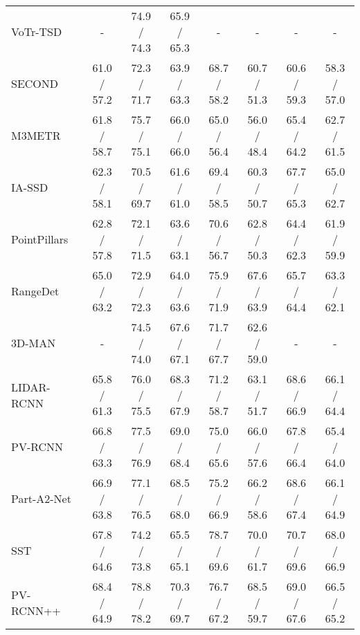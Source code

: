 \documentclass[10pt,twocolumn,letterpaper]{article}
\begin{document}
{\begin{table*}[t]
\begin{center}
{\begin{tabular}{|l|c|cc|cc|cc|}
VoTr-TSD~\cite{voxeltransformer}                                        &  -  & 74.9 / 74.3     & 65.9 / 65.3     & -  &  -       &  -      &  -     \\
SECOND~\cite{second}                                         & 61.0 / 57.2 & 72.3 / 71.7     & 63.9 / 63.3    & 68.7 / 58.2      & 60.7 / 51.3      & 60.6 / 59.3     & 58.3 / 57.0    \\
M3METR~\cite{m3metr}                                        & 61.8 / 58.7 & 75.7 / 75.1     & 66.0 / 66.0    & 65.0 / 56.4      & 56.0 / 48.4      & 65.4 / 64.2     & 62.7 / 61.5    \\
IA-SSD~\cite{ia-ssd}                                       & 62.3 / 58.1 & 70.5 / 69.7     & 61.6 / 61.0    & 69.4 / 58.5      & 60.3 / 50.7      & 67.7 / 65.3     & 65.0 / 62.7    \\
PointPillars~\cite{pointpillars}                                  & 62.8 / 57.8 & 72.1 / 71.5     & 63.6 / 63.1    & 70.6 / 56.7      & 62.8 / 50.3      & 64.4 / 62.3     & 61.9 / 59.9    \\
RangeDet~\cite{rangedet}                                      & 65.0 / 63.2 & 72.9 / 72.3     & 64.0 / 63.6    & 75.9 / 71.9      & 67.6 / 63.9      & 65.7 / 64.4     & 63.3 / 62.1    \\
3D-MAN~\cite{3d-man}                                        &  -  & 74.5 / 74.0 & 67.6 / 67.1 & 71.7 / 67.7 & 62.6 / 59.0   &  -  &  -     \\
LIDAR-RCNN~\cite{lidar-rcnn}                                     & 65.8 / 61.3 & 76.0 / 75.5     & 68.3 / 67.9    & 71.2 / 58.7      & 63.1 / 51.7      & 68.6 / 66.9     & 66.1 / 64.4    \\
PV-RCNN~\cite{pvrcnn}                                        & 66.8 / 63.3 & 77.5 / 76.9     & 69.0 / 68.4    & 75.0 / 65.6      & 66.0 / 57.6      & 67.8 / 66.4     & 65.4 / 64.0    \\
Part-A2-Net~\cite{part-a2}                                    & 66.9 / 63.8 & 77.1 / 76.5     & 68.5 / 68.0    & 75.2 / 66.9      & 66.2 / 58.6      & 68.6 / 67.4     & 66.1 / 64.9    \\
SST~\cite{single-stride-transformer}                                            & 67.8 / 64.6 & 74.2 / 73.8     & 65.5 / 65.1    & 78.7 / 69.6      & 70.0 / 61.7      & 70.7 / 69.6     & 68.0 / 66.9    \\
PV-RCNN++~\cite{pvrcnn++}                                      & 68.4 / 64.9 & 78.8 / 78.2     & 70.3 / 69.7    & 76.7 / 67.2      & 68.5 / 59.7      & 69.0 / 67.6     & 66.5 / 65.2    \\

\end{tabular}}
\end{center}
\end{table*}}
\end{document}
